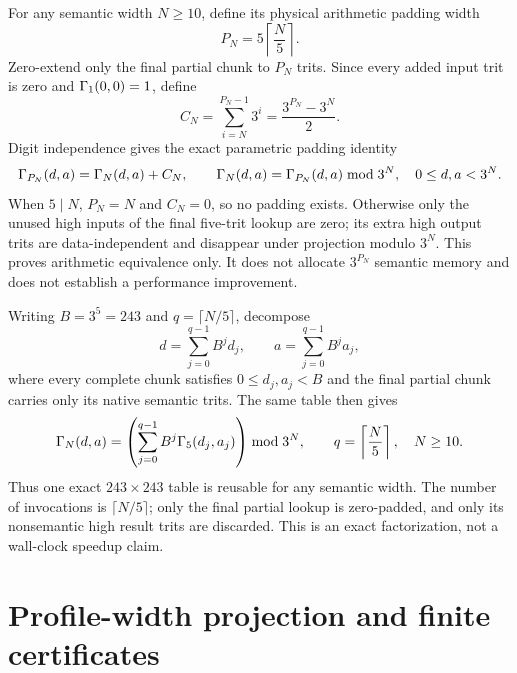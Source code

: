 \documentclass{article}
\begin{document}
For any semantic width $N\geq10$, define its physical arithmetic padding width
\[
  P_N=5\left\lceil\frac{N}{5}\right\rceil.
\]
Zero-extend only the final partial chunk to $P_N$ trits. Since every added input
trit is zero and $\Gamma_{1}\!\left(0,0\right)=1$, define
\[
  C_N=\sum_{i=N}^{P_N-1}3^i=\frac{3^{P_N}-3^N}{2}.
\]
Digit independence gives the exact parametric padding identity
\begin{equation}
  \Gamma_{P_N}\!\left(d,a\right)=\Gamma_{N}\!\left(d,a\right)+C_N,
  \qquad
  \Gamma_{N}\!\left(d,a\right)=\Gamma_{P_N}\!\left(d,a\right)\bmod3^N,
  \quad 0\leq d,a<3^N.
  \label{eq:optimization-crazy-zero-padded-chunk-projection}
\end{equation}
When $5\mid N$, $P_N=N$ and $C_N=0$, so no padding exists. Otherwise only the
unused high inputs of the final five-trit lookup are zero; its extra high output
trits are data-independent and disappear under projection modulo $3^N$. This
proves arithmetic equivalence only. It does not allocate $3^{P_N}$ semantic
memory and does not establish a performance improvement.

Writing $B=3^5=243$ and $q=\lceil N/5\rceil$, decompose
\[
  d=\sum_{j=0}^{q-1} B^j d_j,
  \qquad
  a=\sum_{j=0}^{q-1} B^j a_j,
\]
where every complete chunk satisfies $0\leq d_j,a_j<B$ and the final partial
chunk carries
only its native semantic trits. The same table then gives
\begin{equation}
  \Gamma_{N}\!\left(d,a\right)
    = \left(
        \sum_{j=0}^{q-1} B^j\Gamma_{5}\!\left(d_j,a_j\right)
      \right)\bmod3^N,
  \qquad q=\left\lceil\frac{N}{5}\right\rceil,
  \quad N\geq10.
  \label{eq:optimization-crazy-uniform-chunk-factorization}
\end{equation}
Thus one exact $243\times243$ table is reusable for any semantic width. The
number of invocations is $\lceil N/5\rceil$; only the final partial lookup is
zero-padded, and only its nonsemantic high result trits are discarded. This is
an exact factorization, not a wall-clock speedup claim.

\section{Profile-width projection and finite certificates}
\end{document}
